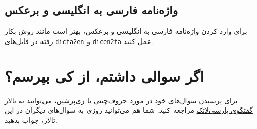 \subsection{واژه‌نامه فارسی به انگلیسی و برعکس}
برای وارد کردن واژه‌نامه فارسی به انگلیسی و برعکس، بهتر است مانند روش بکار رفته در فایل‌های 
\verb;dicfa2en;
و
\verb;dicen2fa;
عمل کنید.

\section{اگر سوالی داشتم، از کی بپرسم؟}
برای پرسیدن سوال‌های خود در مورد حروف‌چینی با زی‌پرشین،  می‌توانید به
 \href{http://forum.parsilatex.com}{تالار گفتگوی پارسی‌لاتک}%
مراجعه کنید. شما هم می‌توانید روزی به سوال‌های دیگران در این تالار، جواب بدهید.
